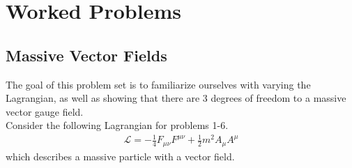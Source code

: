 \documentclass[a4paper,11pt]{article}
\numberwithin{equation}{section}
\theoremstyle{definition}
\newcommand{\lag}{\mathcal{L}}
\begin{document}
\section{Worked Problems}

\subsection{Massive Vector Fields}
The goal of this problem set is to familiarize ourselves with varying the Lagrangian, as well as showing that there are 3 degrees of freedom to a massive vector gauge field. \\

Consider the following Lagrangian for problems 1-6. 
\begin{align}
\lag = -\frac{1}{4}F_{\mu\nu}F^{\mu\nu} + \frac{1}{2}m^2 A_\mu A^\mu
\end{align}
which describes a massive particle with a vector field.\\
\end{document}
